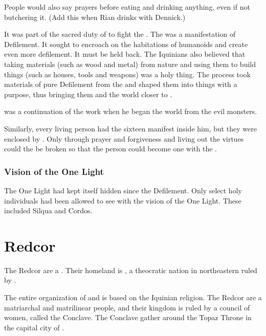 People would also say prayers before eating and drinking anything, even if not butchering it.
(Add this when Rian drinks with Dennick.)

It was part of the sacred duty of \tikkun to fight the .
The \wylde was a manifestation of Defilement.
It sought to encroach on the habitations of humanoids and create even more defilement.
It must be held back. 
The Iquinians also believed that taking materials (such as wood and metal) from nature and using them to build things (such as houses, tools and weapons) was a holy thing. 
The process took materials of pure Defilement from the \wylde and shaped them into things with a purpose, thus bringing them and the world closer to \iquin. 

\Tikkun was a continuation of the work  when he began  the world from the evil monsters.

Similarly, every living person had the sixteen \sephiroth manifest inside him, but they were enclosed by \qliphoth. 
Only through prayer and forgiveness and living out the virtues could the \qliphoth be broken so that the person could become one with the \sephiroth. 





\subsubsection{Vision of the One Light}
The One Light had kept itself hidden since the Defilement. 
Only select holy individuals had been allowed to see with the vision of the One Light.
These included Silqua and Cordos. 
















\section{Redcor}
The Redcor are a \VaimonClan. 
Their homeland is \Redce, a theocratic nation in northeastern \Velcad{} ruled by \ClanRedcor.

The entire organization of \Redce{} and \ClanRedcor is based on the Iquinian religion. 
The Redcor are a matriarchal and matrilinear people, and their kingdom is ruled by a council of women, called the {Conclave}. The Conclave gather around the Topaz Throne in the capital city of \Redce{}. 

